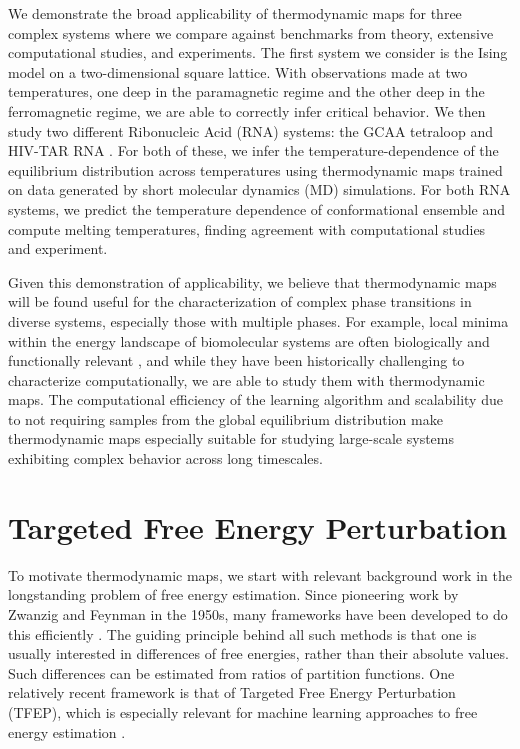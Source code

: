 We demonstrate the broad applicability of thermodynamic maps for three complex systems where we compare against benchmarks from theory, extensive computational studies, and experiments. The first system we consider is the Ising model on a two-dimensional square lattice. With observations made at two temperatures, one deep in the paramagnetic regime and the other deep in the ferromagnetic regime, we are able to correctly infer critical behavior. We then study two different Ribonucleic Acid (RNA) systems: the GCAA tetraloop and HIV-TAR RNA \cite{gcaa-nmr,hiv-nmr}. For both of these, we infer the temperature-dependence of the equilibrium distribution across temperatures using thermodynamic maps trained on data generated by short molecular dynamics (MD) simulations. For both RNA systems, we predict the temperature dependence of conformational ensemble and compute melting temperatures, finding agreement with computational studies and experiment.

Given this demonstration of applicability, we believe that thermodynamic maps will be found useful for the characterization of complex phase transitions in diverse systems, especially those with multiple phases. For example, local minima within the energy landscape of biomolecular systems are often biologically and functionally relevant \cite{excited-states}, and while they have been historically challenging to characterize computationally, we are able to study them with thermodynamic maps. The computational efficiency of the learning algorithm and scalability due to not requiring samples from the global equilibrium distribution make thermodynamic maps especially suitable for studying large-scale systems exhibiting complex behavior across long timescales.

\section{Targeted Free Energy Perturbation}
\label{ch4:sec:TFEP}



To motivate thermodynamic maps, we start with relevant background work in the longstanding problem of free energy estimation. Since pioneering work by Zwanzig and Feynman in the 1950s, many frameworks have been developed to do this efficiently \cite{zwanzig-fep,feynman,TI,mbar,bar}. The guiding principle behind all such methods is that one is usually interested in differences of free energies, rather than their absolute values. Such differences can be estimated from ratios of partition functions.
One relatively recent framework is that of Targeted Free Energy Perturbation (TFEP), which is especially relevant for machine learning approaches to free energy estimation \cite{TFEP}. 


